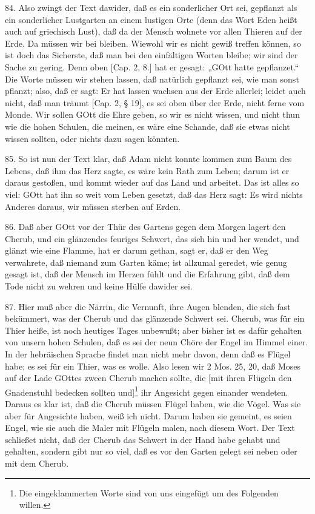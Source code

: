 84. Also zwingt der Text dawider, daß es ein sonderlicher Ort sei, gepflanzt als ein sonderlicher Lustgarten an einem lustigen Orte (denn das Wort Eden heißt auch auf griechisch Lust), daß da der Mensch wohnete vor allen Thieren auf der Erde. Da müssen wir bei bleiben. Wiewohl wir es nicht gewiß treffen können, so ist doch das Sicherste, daß man bei den einfältigen Worten bleibe; wir sind der Sache zu gering. Denn oben [Cap. 2, 8.] hat er gesagt: „GOtt hatte gepflanzet.“ Die Worte müssen wir stehen lassen, daß natürlich gepflanzt sei, wie man sonst pflanzt; also, daß er sagt: Er hat lassen wachsen aus der Erde allerlei; leidet auch nicht, daß man träumt [Cap. 2, § 19], es sei oben über der Erde, nicht ferne vom Monde. Wir sollen GOtt die Ehre geben, so wir es nicht wissen, und nicht thun wie die hohen Schulen, die meinen, es wäre eine Schande, daß sie etwas nicht wissen sollten, oder nichts dazu sagen könnten.

85. So ist nun der Text klar, daß Adam nicht konnte kommen zum Baum des Lebens, daß ihm das Herz sagte, es wäre kein Rath zum Leben; darum ist er daraus gestoßen, und kommt wieder auf das Land und arbeitet. Das ist alles so viel: GOtt hat ihn so weit vom Leben gesetzt, daß das Herz sagt: Es wird nichts Anderes daraus, wir müssen sterben auf Erden.

86. Daß aber GOtt vor der Thür des Gartens gegen dem Morgen lagert den Cherub, und ein glänzendes feuriges Schwert, das sich hin und her wendet, und glänzt wie eine Flamme, hat er darum gethan, sagt er, daß er den Weg verwahrete, daß niemand zum Garten käme; ist allzumal geredet, wie genug gesagt ist, daß der Mensch im Herzen fühlt und die Erfahrung gibt, daß dem Tode nicht zu wehren und keine Hülfe dawider sei.

87. Hier muß aber die Närrin, die Vernunft, ihre Augen blenden, die sich fast bekümmert, was der Cherub und das glänzende Schwert sei. Cherub, was für ein Thier heiße, ist noch heutiges Tages unbewußt; aber bisher ist es dafür gehalten von unsern hohen Schulen, daß es sei der neun Chöre der Engel im Himmel einer. In der hebräischen Sprache findet man nicht mehr davon, denn daß es Flügel habe; es sei für ein Thier, was es wolle. Also lesen wir 2 Mos. 25, 20, daß Moses auf der Lade GOttes zween Cherub machen sollte, die [mit ihren Flügeln den Gnadenstuhl bedecken sollten und]\footnote{Die eingeklammerten Worte sind von uns eingefügt um des Folgenden willen.} ihr Angesicht gegen einander wendeten. Daraus es klar ist, daß die Cherub müssen Flügel haben, wie die Vögel. Was sie aber für Angesichte haben, weiß ich nicht. Darum haben sie gemeint, es seien Engel, wie sie auch die Maler mit Flügeln malen, nach diesem Wort. Der Text schließet nicht, daß der Cherub das Schwert in der Hand habe gehabt und gehalten, sondern gibt nur so viel, daß es vor den Garten gelegt sei neben oder mit dem Cherub.

